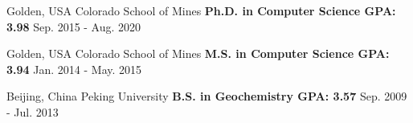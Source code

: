 \vspace{-.15in}
\renewcommand{\arraystretch}{1}

\begin{cventries}
	\cveduentry
		{Golden, USA} %
	{Colorado School of Mines} %
	{\textbf{Ph.D. in Computer Science  \qquad  GPA: 3.98}} 
	{Sep. 2015 - Aug. 2020} %
	
	
	\cveduentry
	{Golden, USA} %
	{Colorado School of Mines} %
		{\textbf{M.S. in Computer Science \qquad GPA: 3.94}} %
		{Jan. 2014 - May. 2015} %
	
	
	\cveduentry
		{Beijing, China} %
	{Peking University} %
	{\textbf{B.S. in Geochemistry  \qquad GPA: 3.57}} %
	{Sep. 2009 - Jul. 2013} %

\end{cventries}
